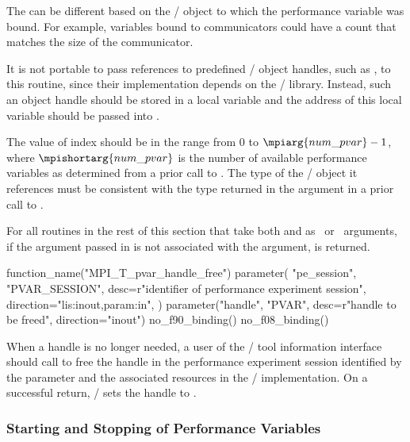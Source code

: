\begin{users}
The  can be different based on the \MPI/ object to which the
performance variable was bound.  For example, variables bound to
communicators could have a count that matches the size of the communicator.

It is not portable to pass references to predefined \MPI/ object handles,
such as , to this routine, since their
implementation depends on the \MPI/ library.  Instead, such an object
handle should be stored in a local variable and the address of this local
variable should be passed into .
\end{users}

The value of index should be in the range from $0$ to $\mpiarg{num\_pvar}-1$,
where $\mpishortarg{num\_pvar}$ is the number of available performance
variables as determined from a prior call to
.  The type of the \MPI/ object it
references must be consistent with the type returned in the 
argument in a prior call to .

For all routines in the rest of this section that take both 
and  as \IN\ or \INOUT\ arguments, if the 
argument passed in is not associated with the  argument,
 is returned.

%
%
\begin{mpi-binding}
    function_name("MPI_T_pvar_handle_free")
    parameter(
        "pe_session",
        "PVAR_SESSION",
        desc=r"identifier of performance experiment session",
        direction="lis:inout,param:in",
    )
    parameter("handle", "PVAR", desc=r"handle to be freed", direction="inout")
    no_f90_binding()
    no_f08_binding()
\end{mpi-binding}

When a handle is no longer needed, a user of the \MPI/ tool information
interface should call  to free the
handle in the performance experiment session identified by the parameter  and the
associated resources in the \MPI/  implementation.  On a successful return,
\MPI/ sets the handle to .


\subsubsection{Starting and Stopping of Performance Variables}

